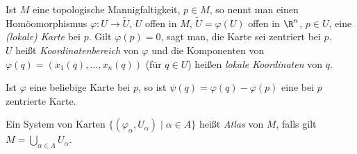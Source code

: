 \begin{defn}
	\begin{notat*}
		Ist $M$ eine topologische Mannigfaltigkeit, $p \in M$, so nennt man einen Homöomorphismus $\varphi: U \to \tilde{U}$, $U$ offen in $M$, $\tilde{U} = \varphi(U)$ offen in $\R^n$, $p \in U$, eine \emph{(lokale) Karte} bei $p$. Gilt $ \varphi(p) = 0 $, sagt man, die Karte sei zentriert bei $p$.\\
		$U$ heißt \emph{Koordinatenbereich} von $\varphi$ und die Komponenten von $\varphi(q) = (x_1(q),\dots,x_n(q))$ (für $q \in U$) heißen \emph{lokale Koordinaten} von $q$.
		\begin{rem*}
			Ist $\varphi$ eine beliebige Karte bei $p$, so ist $\psi(q) = \varphi(q) - \varphi(p)$ eine bei $p$ zentrierte Karte.
		\end{rem*}
	\end{notat*}
	Ein System von Karten $ \{(\varphi_\alpha,U_\alpha) \mid \alpha \in A \} $ heißt \emph{Atlas} von $M$, falls gilt $ M = \bigcup\limits_{\alpha \in A} U_\alpha $.
\end{defn}

